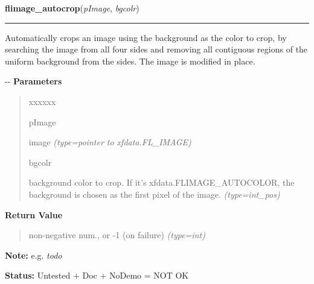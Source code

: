 \hspace{.8\funcindent}\begin{boxedminipage}{\funcwidth}

    \raggedright \textbf{flimage\_autocrop}(\textit{pImage}, \textit{bgcolr})

    \vspace{-1.5ex}

    \rule{\textwidth}{0.5\fboxrule}
\setlength{\parskip}{2ex}

Automatically crops an image using the background as the color to crop,
by searching the image from all four sides and removing all contiguous
regions of the uniform background from the sides. The image is modified in
place.

-{}-
\setlength{\parskip}{1ex}
      \textbf{Parameters}
      \vspace{-1ex}

      \begin{quote}
        \begin{Ventry}{xxxxxx}

          \item[pImage]


image
            {\it (type=pointer to xfdata.FL\_IMAGE)}

          \item[bgcolr]


background color to crop. If it's xfdata.FLIMAGE\_AUTOCOLOR, the
background is chosen as the first pixel of the image.
            {\it (type=int\_pos)}

        \end{Ventry}

      \end{quote}

      \textbf{Return Value}
    \vspace{-1ex}

      \begin{quote}

non-negative num., or -1 (on failure)
      {\it (type=int)}

      \end{quote}

\textbf{Note:} 
e.g. \emph{todo}


\textbf{Status:} 
Untested + Doc + NoDemo = NOT OK


    \end{boxedminipage}

    \label{xformslib:flflimage:flimage_get_autocrop}

